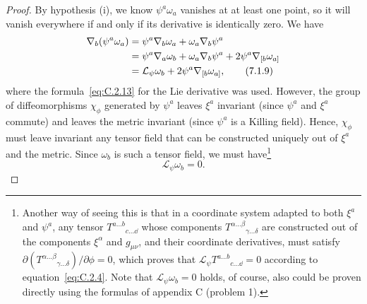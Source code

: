 \begin{proof}
By hypothesis (i), we know \(\psi^a\omega_a\) vanishes at at least one point, so it
will vanish everywhere if and only if its derivative is identically zero. We have
\begin{align}
  \nabla_b(\psi^a\omega_a)
    &=\psi^a\nabla_b\omega_a+\omega_a\nabla_b\psi^a\notag\\
    &=\psi^a\nabla_a\omega_b+\omega_a\nabla_b\psi^a
      +2\psi^a\nabla_{[b}\omega_{a]}\notag\\
    &=\mathcal L_\psi\omega_b+2\psi^a\nabla_{[b}\omega_{a]} ,
  \tag{7.1.9}\label{eq:7.1.9}
\end{align}
where the formula~\eqref{eq:C.2.13} for the Lie derivative was used. However, the
group of diffeomorphisms \(\chi_\phi\) generated by \(\psi^a\) leaves \(\xi^a\)
invariant (since \(\psi^a\) and \(\xi^a\) commute) and leaves the metric invariant
(since \(\psi^a\) is a Killing field). Hence, \(\chi_\phi\) must leave invariant any
tensor field that can be constructed uniquely out of \(\xi^a\) and the metric. Since
\(\omega_b\) is such a tensor field, we must have\footnote{Another way of seeing
this is that in a coordinate system adapted to both \(\xi^a\) and \(\psi^a\), any
tensor \(T^{a\dots b}{}_{c\dots \dd}\) whose components
\(T^{\alpha\dots\beta}{}_{\gamma\dots\delta}\) are constructed out of the
components \(\xi^\alpha\) and \(g_{\mu\nu}\), and their coordinate derivatives,
must satisfy
\(\partial(T^{\alpha\dots\beta}{}_{\gamma\dots\delta})/\partial\phi=0\), which
proves that \(\mathcal L_\psi T^{a\dots b}{}_{c\dots \dd}=0\) according to
equation~\eqref{eq:C.2.4}. Note that \(\mathcal L_\psi\omega_b=0\) holds, of
course, also could be proven directly using the formulas of appendix C (problem 1).}
\begin{equation}
  \mathcal L_\psi\omega_b=0 .
  \tag{7.1.10}\label{eq:7.1.10}
\end{equation}


\end{proof}
